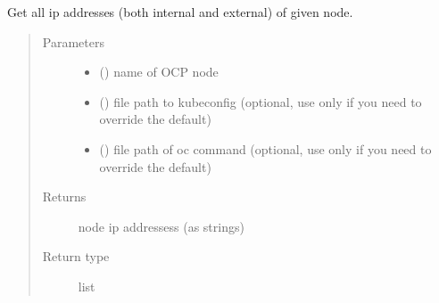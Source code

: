 \documentclass[letterpaper,10pt,english]{sphinxmanual}
\begin{document}
\begin{fulllineitems}
\label{\detokenize{ocpnetsplit:ocpnetsplit.ocp.get_all_node_ip_addrs}}
Get all ip addresses (both internal and external) of given node.
\begin{quote}\begin{description}
\item[{Parameters}] \leavevmode\begin{itemize}
\item {} 
 () \textendash{} name of OCP node

\item {} 
 () \textendash{} file path to kubeconfig (optional, use only if you
need to override the default)

\item {} 
 () \textendash{} file path of oc command (optional, use only if
you need to override the default)

\end{itemize}

\item[{Returns}] \leavevmode
node ip addressess (as strings)

\item[{Return type}] \leavevmode
list

\end{description}\end{quote}

\end{fulllineitems}

\end{document}
